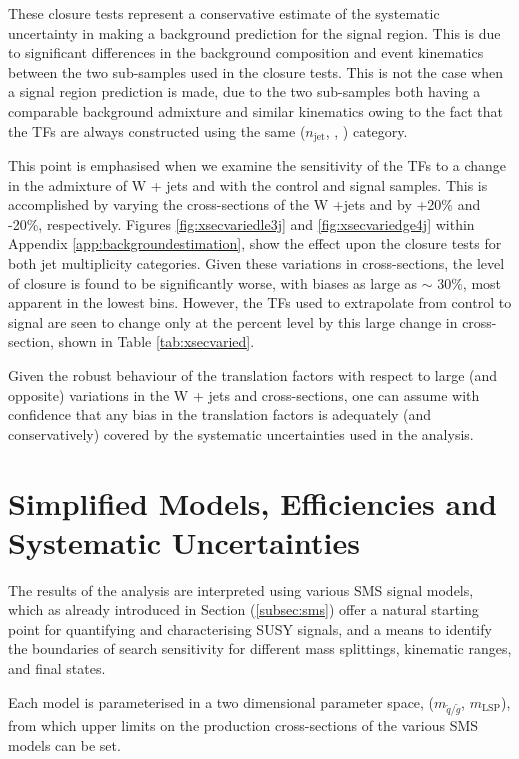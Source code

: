 These closure tests represent a conservative estimate of the systematic uncertainty in making a background prediction for the signal region. This is due to significant differences in the background composition and event kinematics between the two sub-samples used in the closure tests. This is not the case when a signal region prediction is made, due to the two sub-samples both having a comparable background admixture and similar kinematics owing to the fact that the \ac{TF}s are always constructed using the same ($n_{\text{jet}}$, \nbreco, \theht) category.

This point is emphasised when we examine the sensitivity of the \ac{TF}s to a change in the admixture of W + jets and \ttbar with the control and signal samples. This is accomplished by varying the cross-sections of the W +jets and \ttbar by +20\% and -20\%, respectively. Figures \ref{fig:xsecvariedle3j} and \ref{fig:xsecvariedge4j} within Appendix \ref{app:backgroundestimation}, show the effect upon the closure tests for both jet multiplicity categories. Given these variations in cross-sections, the level of closure is found to be significantly worse, with biases as large as $\sim$ 30\%, most apparent in the lowest \theht bins. However, the \ac{TF}s used to extrapolate from control to signal are seen to change only at the percent level by this large change in cross-section, shown in Table \ref{tab:xsecvaried}.

Given the robust behaviour of the translation factors with respect to large (and opposite) variations in the W + jets and \ttbar cross-sections, one can assume with confidence that any bias in the translation factors is adequately (and conservatively) covered by the systematic uncertainties used in the analysis.

\section{Simplified Models, Efficiencies and Systematic Uncertainties}
\label{sec:smsmodels}

The results of the analysis are interpreted using various \ac{SMS} signal models, which as already introduced in Section (\ref{subsec:sms}) offer a natural starting point for quantifying and characterising \ac{SUSY} signals, and a means to identify the boundaries of search sensitivity for different mass splittings, kinematic ranges, and final states. 

Each model is parameterised in a two dimensional parameter space, ($m_{\widetilde{q}/\widetilde{g}}$, $m_{\text{LSP}}$), from which upper limits on the production cross-sections of the various \ac{SMS} models can be set.

